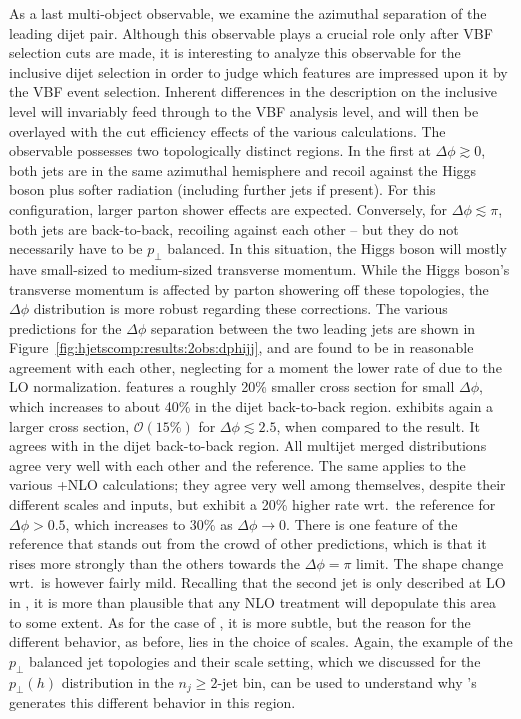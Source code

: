 As a last multi-object observable, we examine the azimuthal separation of 
the leading dijet pair. Although this observable plays a crucial role 
only after VBF selection cuts are made,  it is interesting to analyze this
observable for the inclusive dijet selection in order to judge which features
are impressed upon it by the VBF event selection.
Inherent differences in the description on the inclusive level will
invariably feed through to the VBF analysis level, and will then be
overlayed with the cut efficiency effects of the various calculations.
The observable possesses two topologically distinct regions. In the
first at $\Delta\phi\gtrsim0$, both jets are in the same azimuthal
hemisphere and recoil against the Higgs boson plus softer radiation
(including further jets if present). 
For this configuration, larger
parton shower effects are expected.
Conversely, for $\Delta\phi\lesssim\pi$, both jets are back-to-back,
recoiling against each other -- but they do not necessarily have to be
$p_\perp$ balanced. In this situation, the Higgs boson will
mostly have small-sized to medium-sized transverse momentum.
While the Higgs boson's transverse momentum is affected by parton
showering off these topologies, the $\Delta\phi$ distribution is more
robust regarding these corrections.
The various predictions for the $\Delta\phi$ separation between the
two leading jets are shown in Figure~\ref{fig:hjetscomp:results:2obs:dphijj},
and are found to be in reasonable agreement with each other,
neglecting for a moment the lower rate of \Hej due to the LO
normalization. \Hej
features a roughly 20\% smaller cross section for small $\Delta\phi$,
which increases to about 40\% in the dijet back-to-back region.
\Sherpa \NNLOPS exhibits again a larger cross section,
$\mathcal{O}(15\%)$ for $\Delta\phi\lesssim2.5$, when compared to the
\Powheg \NNLOPS result. It agrees with \Powheg \NNLOPS  in the dijet back-to-back
region. All multijet merged distributions agree very well with each
other and the reference. The same applies to the various
\GoSam{}+\Sherpa NLO calculations; they agree very well among
themselves, despite their different scales and inputs, but exhibit a
20\% higher rate wrt.~the reference for $\Delta\phi>0.5$, which
increases to 30\% as $\Delta\phi\to0$. 
There is one feature of the \Powheg reference that stands out from the
crowd of other predictions, which is that it rises more strongly
than the others towards the $\Delta\phi=\pi$ limit. The shape change
wrt.~\Hej is however fairly mild. Recalling that the second jet is
only described at LO in \Powheg, it is more than plausible that any
NLO treatment will depopulate this area to some extent. As for the
case of \Sherpa \NNLOPS, it is more subtle, but the reason for the
different behavior, as before, lies in the choice of 
scales. Again, the example of the $p_\perp$ balanced jet topologies and
their scale setting, which we discussed for the $p_\perp(h)$
distribution in the $n_j\ge2$-jet bin, can be used to understand why
\Sherpa's \NNLOPS generates this different behavior in this region.



